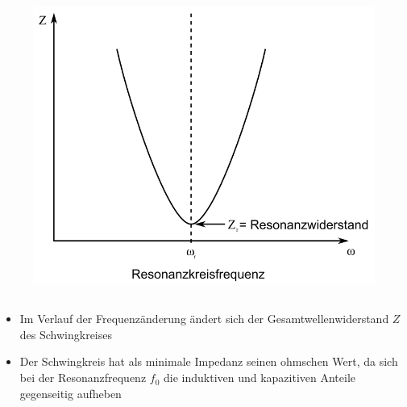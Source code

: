 \begin{frame}
\begin{columns}
\begin{figure}
      \includegraphics[width=\textwidth,height=.4\textheight,keepaspectratio]{e07/SerirenschwSig.png}
    \end{figure}
  \end{columns}
  \begin{itemize}
    \item Im Verlauf der Frequenzänderung ändert sich der Gesamtwellenwiderstand $Z$ des Schwingkreises
    \item Der Schwingkreis hat als minimale Impedanz seinen ohmschen Wert, da sich bei der Resonanzfrequenz $f_{0}$ die induktiven und kapazitiven Anteile gegenseitig aufheben
  \end{itemize}
\end{frame}

